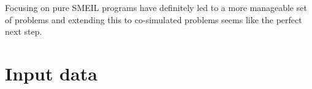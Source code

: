 Focusing on pure SMEIL programs have definitely led to a more manageable set of problems and extending this to co-simulated problems seems like the perfect next step. 
\section{Input data}



